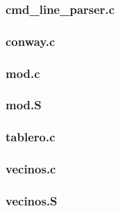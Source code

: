 \documentclass[a4paper,12pt]{article}
\numberwithin{equation}{section}
\numberwithin{figure}{section}
\begin{document}
	\subsubsection{cmd\_line\_parser.c}\label{app_cmd_line_parser}
	
	\clearpage
	
	\subsubsection{conway.c}\label{app_main}
	
	\clearpage
	
	\subsubsection{mod.c}\label{app_mod}
	
	\clearpage
	
	\subsubsection{mod.S}\label{app_mod_s}
	
	\clearpage
	
	\subsubsection{tablero.c}\label{app_tablero}
	
	\clearpage
	
	\subsubsection{vecinos.c}\label{app_vecinos}
	
	\clearpage
	
	\subsubsection{vecinos.S}\label{app_vecinos_s}
	
	\clearpage
	
\end{document}
